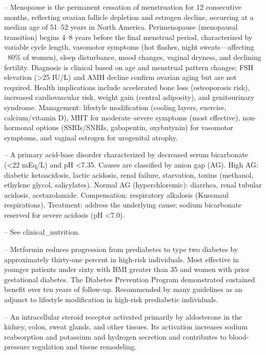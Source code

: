 -- Menopause is the permanent cessation of menstruation for 12 consecutive months, reflecting ovarian follicle depletion and estrogen decline, occurring at a median age of 51--52 years in North America. Perimenopause (menopausal transition) begins 4--8 years before the final menstrual period, characterized by variable cycle length, vasomotor symptoms (hot flashes, night sweats—affecting ~80\% of women), sleep disturbance, mood changes, vaginal dryness, and declining fertility. Diagnosis is clinical based on age and menstrual pattern changes; FSH elevation (>25 IU/L) and AMH decline confirm ovarian aging but are not required. Health implications include accelerated bone loss (osteoporosis risk), increased cardiovascular risk, weight gain (central adiposity), and genitourinary syndrome. Management: lifestyle modification (cooling layers, exercise, calcium/vitamin D), MHT for moderate--severe symptoms (most effective), non-hormonal options (SSRIs/SNRIs, gabapentin, oxybutynin) for vasomotor symptoms, and vaginal estrogen for urogenital atrophy.

-- A primary acid-base disorder characterized by decreased serum bicarbonate (<22 mEq/L) and pH <7.35. Causes are classified by anion gap (AG). High AG: diabetic ketoacidosis, lactic acidosis, renal failure, starvation, toxins (methanol, ethylene glycol, salicylates). Normal AG (hyperchloremic): diarrhea, renal tubular acidosis, acetazolamide. Compensation: respiratory alkalosis (Kussmaul respirations). Treatment: address the underlying cause; sodium bicarbonate reserved for severe acidosis (pH <7.0).

-- See clinical\_nutrition.

-- Metformin reduces progression from prediabetes to type two diabetes by approximately thirty-one percent in high-risk individuals. Most effective in younger patients under sixty with BMI greater than 35 and women with prior gestational diabetes. The Diabetes Prevention Program demonstrated sustained benefit over ten years of follow-up. Recommended by many guidelines as an adjunct to lifestyle modification in high-risk prediabetic individuals.

-- An intracellular steroid receptor activated primarily by aldosterone in the kidney, colon, sweat glands, and other tissues. Its activation increases sodium reabsorption and potassium and hydrogen secretion and contributes to blood-pressure regulation and tissue remodeling.

